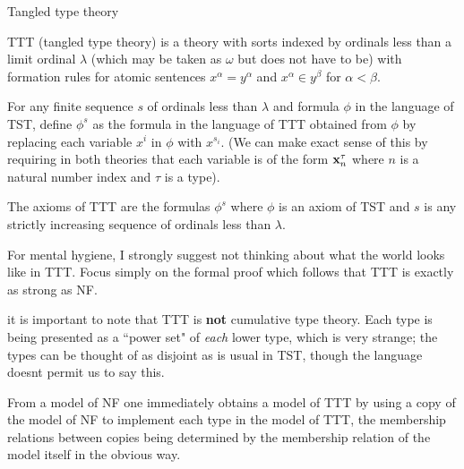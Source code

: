 \documentclass{slides}
\begin{document}
\begin{slide}

{\Large Tangled type theory}

TTT (tangled type theory) is a theory with sorts indexed by ordinals less than a limit ordinal $\lambda$ (which may be taken as $\omega$ but does not have to be) with formation rules
for atomic sentences $x^{\alpha} = y^{\alpha}$ and $x^{\alpha} \in y^{\beta}$ for $\alpha<\beta$.

For any finite sequence $s$ of ordinals less than $\lambda$ and formula $\phi$ in the language of TST, define $\phi^s$ as the formula in the language of TTT obtained from $\phi$ by replacing each variable $x^i$ in $\phi$ with $x^{s_i}$. (We can make exact sense of this by requiring in both theories that each variable is of the form ${\bf x}_n^{\tau}$ where $n$ is a natural number index and $\tau$ is a type).

The axioms of TTT are the formulas $\phi^s$ where $\phi$ is an axiom of TST and $s$ is any strictly increasing sequence of ordinals less than $\lambda$.

\end{slide}

\begin{slide}

For mental hygiene, I strongly suggest not thinking about what the world looks like in TTT.  Focus simply on the formal proof which follows that TTT is exactly as strong as NF.

it is important to note that TTT is {\bf not} cumulative type theory.  Each type is being presented as a ``power set" of {\em each} lower type, which is very strange;  the types can be thought of as disjoint as is usual in TST, though the language doesnt permit us to say this.

\end{slide}

\begin{slide}

From a model of NF one immediately obtains a model of TTT by using a copy of the model of NF to implement each type in the model of TTT, the membership relations between copies being determined by the membership relation of the model itself in the obvious way.

\end{slide}
\end{document}
